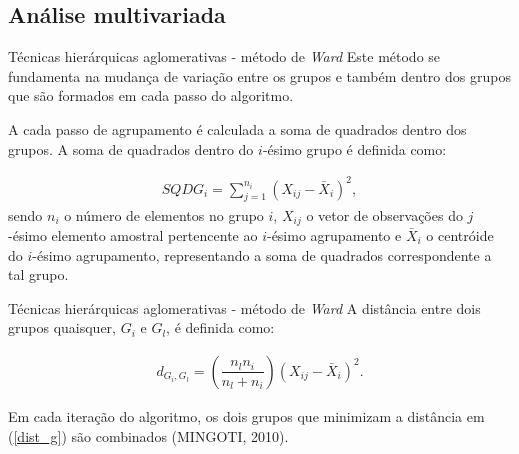 \documentclass[aspectratio=169]{beamer}
\begin{document}
\subsection{Análise multivariada}

\begin{frame}{Técnicas hierárquicas aglomerativas - método de \textit{Ward}}
     Este método se fundamenta na mudança de variação entre os grupos e também dentro dos grupos que são formados em cada passo do algoritmo. 
     
     A cada passo de agrupamento é calculada a soma de quadrados dentro dos grupos. A soma de quadrados dentro do $i$-ésimo grupo é definida como:  
    \begin{block}{}
    \begin{align*}
    SQDG_i = \sum_{j=1}^{n_i}(X_{ij} - \bar{X}_{i})^2,
    \end{align*}
    sendo $n_i$ o número de elementos no grupo $i$, $X_{ij}$ o vetor de observações do $j$-ésimo elemento amostral pertencente ao $i$-ésimo agrupamento e $\bar{X}_{i}$ o centróide do $i$-ésimo agrupamento, representando a soma de quadrados correspondente a tal grupo.
    \end{block}

\end{frame}

\begin{frame}{Técnicas hierárquicas aglomerativas - método de \textit{Ward}}
    A distância entre dois grupos quaisquer, $G_i$ e $G_l$, é definida como:
    
    \begin{block}{}
    \begin{align}\label{dist_g}
    d_{ G_i,G_l} = \left(\dfrac{n_l n_i}{n_l + n_i}\right)(X_{ij} - \bar{X}_{i})^2.		
    \end{align}
    \end{block}
    
    Em cada iteração do algoritmo, os dois grupos que minimizam a distância em (\ref{dist_g}) são combinados (MINGOTI, 2010).
\end{frame}
\end{document}
